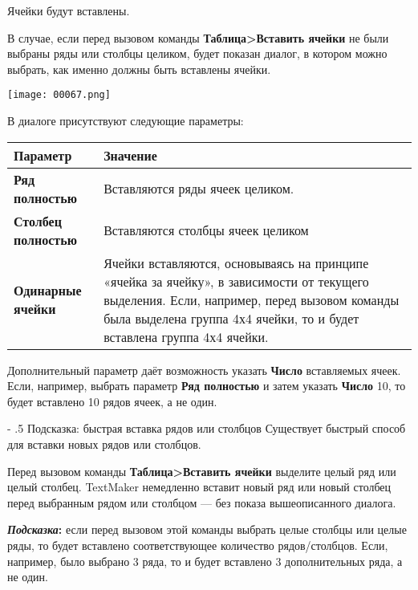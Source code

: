 \documentclass[a4paper,10pt]{article}
\makeatletter
\renewcommand\paragraph{%
   \@startsection{paragraph}{4}{0mm}%
      {-\baselineskip}%
      {.5\baselineskip}%
      {\normalfont\normalsize\bfseries}}
\makeatother
\begin{document}
Ячейки будут вставлены.

В случае, если перед вызовом команды \textbf{Таблица>Вставить ячейки} не были выбраны ряды или столбцы целиком, будет показан диалог, в котором можно выбрать, как именно должны быть вставлены ячейки.

\texttt{[image: 00067.png]}

В диалоге присутствуют следующие параметры:

\begin{center}
\begin{tabular}{  m{4cm}  m{12cm}  }
 \textbf{Параметр} & \textbf{Значение} \\ 
 \hline
  \textbf{Ряд полностью} & Вставляются ряды ячеек целиком.\\
  \textbf{Столбец полностью} & Вставляются столбцы ячеек целиком\\ 
\textbf{Одинарные ячейки} & Ячейки вставляются, основываясь на принципе «ячейка за ячейку», в зависимости от текущего выделения. Если, например, перед вызовом команды была выделена группа 4х4 ячейки, то и будет вставлена группа 4х4 ячейки.\\
\end{tabular}
\end{center}

Дополнительный параметр даёт возможность указать \textbf{Число} вставляемых ячеек. Если, например, выбрать параметр \textbf{Ряд полностью} и затем указать \textbf{Число} 10, то будет вставлено 10 рядов ячеек, а не один.

\paragraph{Подсказка: быстрая вставка рядов или столбцов}
Существует быстрый способ для вставки новых рядов или столбцов.

Перед вызовом команды \textbf{Таблица>Вставить ячейки} выделите целый ряд или целый столбец. TextMaker немедленно вставит новый ряд или новый столбец перед выбранным рядом или столбцом --- без показа вышеописанного диалога.

\begin{mdframed}[backgroundcolor=blue!10]
\textbf{\textit{Подсказка}:} если перед вызовом этой команды выбрать целые столбцы или целые ряды, то будет вставлено соответствующее количество рядов/столбцов. Если, например, было выбрано 3 ряда, то и будет вставлено 3 дополнительных ряда, а не один.
\end{mdframed}
\end{document}
